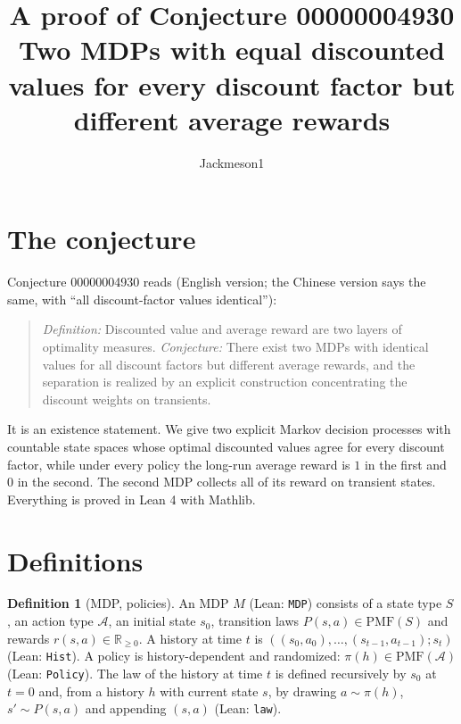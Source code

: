 \documentclass[11pt]{article}
\title{A proof of Conjecture 00000004930\\[2pt]
\large Two MDPs with equal discounted values for every discount factor but different average
rewards}
\author{Jackmeson1}
\date{}
\theoremstyle{definition}
\newtheorem{definition}[theorem]{Definition}
\theoremstyle{remark}
\renewcommand{\_}{\oldus\allowbreak}
\begin{document}
\sloppy
\maketitle

\section{The conjecture}

Conjecture 00000004930 reads (English version; the Chinese version says the same, with
``all discount-factor values identical''):

\begin{quote}
\emph{Definition:} Discounted value and average reward are two layers of optimality measures.
\emph{Conjecture:} There exist two MDPs with identical values for all discount factors but
different average rewards, and the separation is realized by an explicit construction
concentrating the discount weights on transients.
\end{quote}

It is an existence statement. We give two explicit Markov decision processes with countable state
spaces whose optimal discounted values agree for every discount factor, while under every policy
the long-run average reward is $1$ in the first and $0$ in the second. The second MDP collects all
of its reward on transient states. Everything is proved in Lean 4 with Mathlib.

\section{Definitions}

\begin{definition}[MDP, policies]
An MDP $M$ (Lean: \texttt{MDP}) consists of a state type $S$, an action type $\mathcal A$, an initial
state $s_0$, transition laws $P(s,a)\in\mathrm{PMF}(S)$ and rewards $r(s,a)\in\mathbb R_{\ge0}$. A
history at time $t$ is $((s_0,a_0),\dots,(s_{t-1},a_{t-1});s_t)$ (Lean: \texttt{Hist}). A policy is
history-dependent and randomized: $\pi(h)\in\mathrm{PMF}(\mathcal A)$ (Lean: \texttt{Policy}). The law
of the history at time $t$ is defined recursively by $s_0$ at $t=0$ and, from a history $h$ with
current state $s$, by drawing $a\sim\pi(h)$, $s'\sim P(s,a)$ and appending $(s,a)$ (Lean:
\texttt{law}).
\end{definition}
\end{document}

